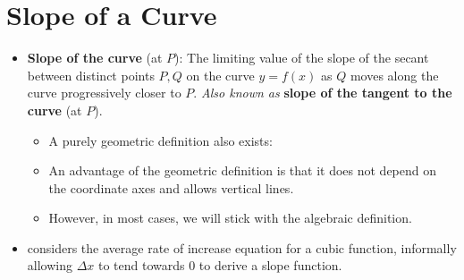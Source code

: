\documentclass[../main.tex]{subfiles}
\begin{document}
\section{Slope of a Curve}
\begin{itemize}
    \item \textbf{Slope of the curve} (at $P$): The limiting value of the slope of the secant between distinct points $P,Q$ on the curve $y=f(x)$ as $Q$ moves along the curve progressively closer to $P$. \emph{Also known as} \textbf{slope of the tangent to the curve} (at $P$).
    \begin{itemize}
        \item A purely geometric definition also exists: 
        \item An advantage of the geometric definition is that it does not depend on the coordinate axes and allows vertical lines.
        \item However, in most cases, we will stick with the algebraic definition.
    \end{itemize}
    \item \cite{bib:Thomas} considers the average rate of increase equation for a cubic function, informally allowing $\Delta x$ to tend towards 0 to derive a slope function.
\end{itemize}
\end{document}
